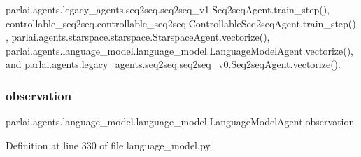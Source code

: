 parlai.\+agents.\+legacy\+\_\+agents.\+seq2seq.\+seq2seq\+\_\+v1.\+Seq2seq\+Agent.\+train\+\_\+step(), controllable\+\_\+seq2seq.\+controllable\+\_\+seq2seq.\+Controllable\+Seq2seq\+Agent.\+train\+\_\+step(), parlai.\+agents.\+starspace.\+starspace.\+Starspace\+Agent.\+vectorize(), parlai.\+agents.\+language\+\_\+model.\+language\+\_\+model.\+Language\+Model\+Agent.\+vectorize(), and parlai.\+agents.\+legacy\+\_\+agents.\+seq2seq.\+seq2seq\+\_\+v0.\+Seq2seq\+Agent.\+vectorize().

\mbox{\label{classparlai_1_1agents_1_1language__model_1_1language__model_1_1LanguageModelAgent_aee73b46f6a1dd58cf369bf39b6c66903}} 
\subsubsection{\texorpdfstring{observation}{observation}}
{\footnotesize\ttfamily parlai.\+agents.\+language\+\_\+model.\+language\+\_\+model.\+Language\+Model\+Agent.\+observation}



Definition at line 330 of file language\+\_\+model.\+py.



